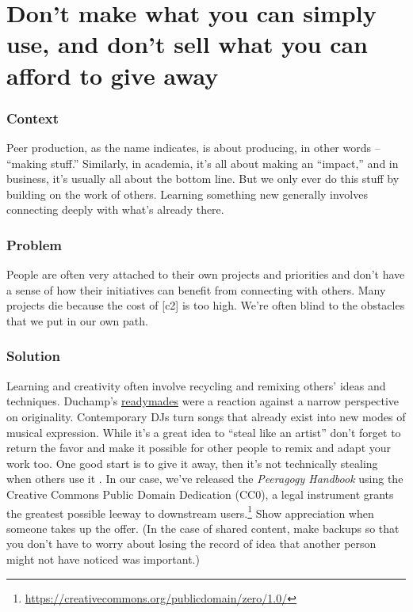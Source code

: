 \begingroup \color{BurntOrange}

\section{Don't make what you can simply use, and don't sell what you can afford to give away} \label{sec:Use_or_make}

\subsubsection*{Context}
Peer production, as the name indicates, is about producing, in other words -- ``making stuff.''  Similarly, in academia, it's all about making an ``impact,'' and in business, it's usually all about the bottom line.  But we only ever do this stuff by building on the work of others.  Learning something new generally involves connecting deeply with what's already there.  

\subsubsection*{Problem}
People are often very attached to their own projects and priorities and don't have a sense of how their initiatives can benefit from connecting with others. Many projects die because the cost of  [c2] is too high.  We're often blind to the obstacles that we put in our own path.

\subsubsection*{Solution} Learning and creativity often involve recycling and remixing others' ideas and techniques.   Duchamp's {\href{https://en.wikipedia.org/w/index.php?title=Readymades_of_Marcel_Duchamp&oldid=660437742}{readymades}} were a reaction against a narrow perspective on originality.  Contemporary DJs turn songs that already exist into new modes of musical expression.  While it's a great idea to ``steal like an artist'' don't forget to return the favor and make it possible for other people to remix and adapt your work too.  One good start is to give it away, then it's not technically stealing when others use it \cite{anderson2009free}. In our case, we've released the \emph{Peeragogy Handbook} using the Creative Commons Public Domain Dedication (CC0), a legal instrument grants the greatest possible leeway to downstream users.\footnote{\url{https://creativecommons.org/publicdomain/zero/1.0/}}  Show appreciation when someone takes up the offer.  (In the case of shared content, make backups so that you don't have to worry about losing the record of idea that another person might not have noticed was important.)

